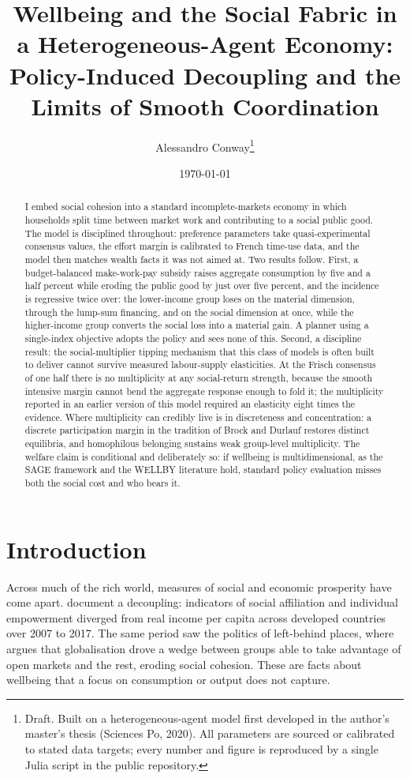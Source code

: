 \documentclass[11pt]{article}
\title{Wellbeing and the Social Fabric in a Heterogeneous-Agent Economy:\\ Policy-Induced Decoupling and the Limits of Smooth Coordination}
\author{Alessandro Conway\thanks{Draft. Built on a heterogeneous-agent model first developed in the author's master's thesis (Sciences Po, 2020). All parameters are sourced or calibrated to stated data targets; every number and figure is reproduced by a single Julia script in the public repository.}}
\date{\today}
\begin{document}
\maketitle

\begin{abstract}
\noindent I embed social cohesion into a standard incomplete-markets economy in which households split time between market work and contributing to a social public good. The model is disciplined throughout: preference parameters take quasi-experimental consensus values, the effort margin is calibrated to French time-use data, and the model then matches wealth facts it was not aimed at. Two results follow. First, a budget-balanced make-work-pay subsidy raises aggregate consumption by five and a half percent while eroding the public good by just over five percent, and the incidence is regressive twice over: the lower-income group loses on the material dimension, through the lump-sum financing, and on the social dimension at once, while the higher-income group converts the social loss into a material gain. A planner using a single-index objective adopts the policy and sees none of this. Second, a discipline result: the social-multiplier tipping mechanism that this class of models is often built to deliver cannot survive measured labour-supply elasticities. At the Frisch consensus of one half there is no multiplicity at any social-return strength, because the smooth intensive margin cannot bend the aggregate response enough to fold it; the multiplicity reported in an earlier version of this model required an elasticity eight times the evidence. Where multiplicity can credibly live is in discreteness and concentration: a discrete participation margin in the tradition of Brock and Durlauf restores distinct equilibria, and homophilous belonging sustains weak group-level multiplicity. The welfare claim is conditional and deliberately so: if wellbeing is multidimensional, as the SAGE framework and the WELLBY literature hold, standard policy evaluation misses both the social cost and who bears it.
\end{abstract}

\section{Introduction}

Across much of the rich world, measures of social and economic prosperity have come apart. \citet{snower2020} document a decoupling: indicators of social affiliation and individual empowerment diverged from real income per capita across developed countries over 2007 to 2017. The same period saw the politics of left-behind places, where \citet{rodrik2018} argues that globalisation drove a wedge between groups able to take advantage of open markets and the rest, eroding social cohesion. These are facts about wellbeing that a focus on consumption or output does not capture.
\end{document}
